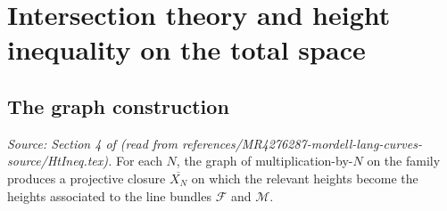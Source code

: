 \section{Intersection theory and height inequality on the total space}

\subsection{The graph construction}

\begin{lemma}
  \label{lem:graph_construction}
  \textit{Source: Section 4 of \cite{MR4276287-mordell-lang-curves} (read from references/MR4276287-mordell-lang-curves-source/HtIneq.tex).}
  For each \(N\), the graph of multiplication-by-\(N\) on the family produces a
  projective closure \(\overline{X_N}\) on which the relevant heights become the
  heights associated to the line bundles \(\mathcal F\) and \(\mathcal M\).
\end{lemma}

